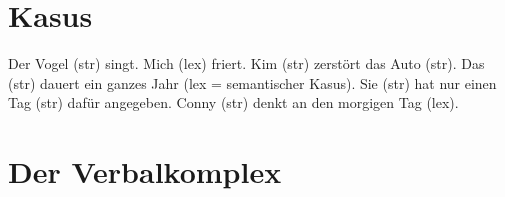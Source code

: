 \section{Kasus}

\eal
\ex Der Vogel (str) singt.  
\ex Mich (lex) friert.    
\ex Kim (str) zerstört das Auto (str).
\ex Das (str) dauert ein ganzes Jahr (lex = semantischer Kasus).
\ex Sie (str) hat nur einen Tag (str) dafür angegeben.
\ex Conny (str) denkt an den morgigen Tag (lex).
\zl

\section{Der Verbalkomplex}

\begin{figure}[H]
\oneline{
\begin{forest}
sm edges
[{\ms[cat]{ head   & \ibox{1} \\
           comps & \eliste\\
            }}
 [{\ibox{2} NP[\type{nom}]} [Aicke]]
 [{\ms[cat]{ head   & \ibox{1} \\
             comps & \ibox{3}\\
            }}
   [\iboxt{5}~\onems{ loc \ms{ head & \ibox{4} \\
                               comps & \ibox{3} \\
                                 }}
     [\iboxt{6}~\onems{ loc \onems{ head  \ms[verb]{ vform & bse  \\
                                                }  \\
                                comps~\ibox{3} \nliste{ \ibox{2} NP[\nom] } \\
                              }\\
                } [singen]]
     [{\onems[cat]{ head~\ibox{4} \ms[verb]{ vform & bse \\
                            } \\
            comps ~ \ibox{3} $\oplus$ \sliste{ \ibox{6} } \\
          }} [können]]]
    [{\ms[cat]{ head & \ibox{1} \ms[verb]{ vform & fin \\
                                                    } \\
                      comps & \ibox{3} $\oplus$ \sliste{ \ibox{5} } \\
                    }} [muss]]]]
\end{forest}}
\end{figure}


